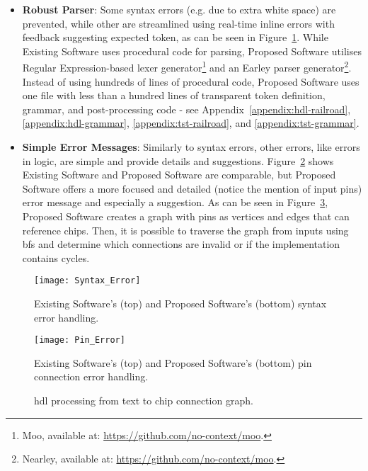 \begin{itemize}
    \item \textbf{Robust Parser}: Some syntax errors (e.g. due to extra white space) are prevented, while other are streamlined using real-time inline errors with feedback suggesting expected token, as can be seen in Figure~\ref{fig:design-syntax-errors}. While Existing Software uses procedural code for parsing, Proposed Software utilises Regular Expression-based lexer generator\footnote{Moo, available at: \url{https://github.com/no-context/moo}.} and an Earley parser generator\footnote{Nearley, available at: \url{https://github.com/no-context/moo}.}. Instead of using hundreds of lines of procedural code, Proposed Software uses one file with less than a hundred lines of transparent token definition, grammar, and post-processing code - see Appendix~\ref{appendix:hdl-railroad}, \ref{appendix:hdl-grammar}, \ref{appendix:tst-railroad}, and \ref{appendix:tst-grammar}.
    \item \textbf{Simple Error Messages}: Similarly to syntax errors, other errors, like errors in logic, are simple and provide details and suggestions. Figure~\ref{fig:design-pin-error} shows Existing Software and Proposed Software are comparable, but Proposed Software offers a more focused and detailed (notice the mention of input pins) error message and especially a suggestion. As can be seen in Figure~\ref{fig:design-text-ast-graph}, Proposed Software creates a graph with pins as vertices and edges that can reference chips. Then, it is possible to traverse the graph from inputs using \gls{bfs} and determine which connections are invalid or if the implementation contains cycles.
\end{itemize}

\begin{figure}[H]
    \centering
    \texttt{[image: Syntax\_Error]}
    \caption{Existing Software's (top) and Proposed Software's (bottom) syntax error handling.}
    \label{fig:design-syntax-errors}
\end{figure}

\begin{figure}[H]
    \centering
    \texttt{[image: Pin\_Error]}
    \caption{Existing Software's (top) and Proposed Software's (bottom) pin connection error handling.}
    \label{fig:design-pin-error}
\end{figure}

\begin{figure}[H]
    \centering
    
    \caption{\gls{hdl} processing from text to chip connection graph.}
    \label{fig:design-text-ast-graph}
\end{figure}

